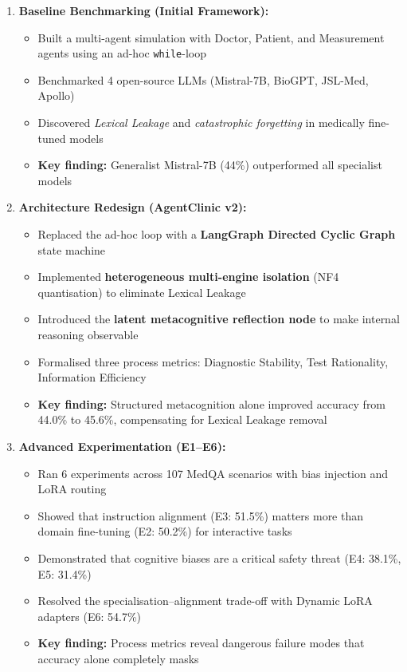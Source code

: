 \begin{enumerate}[label=\textbf{Phase \arabic*:}, leftmargin=2.5cm]
    \item \textbf{Baseline Benchmarking (Initial Framework):}
    \begin{itemize}
        \item Built a multi-agent simulation with Doctor, Patient, and Measurement agents using an ad-hoc \texttt{while}-loop
        \item Benchmarked 4 open-source LLMs (Mistral-7B, BioGPT, JSL-Med, Apollo)
        \item Discovered \textit{Lexical Leakage} and \textit{catastrophic forgetting} in medically fine-tuned models
        \item \textbf{Key finding:} Generalist Mistral-7B (44\%) outperformed all specialist models
    \end{itemize}

    \item \textbf{Architecture Redesign (AgentClinic v2):}
    \begin{itemize}
        \item Replaced the ad-hoc loop with a \textbf{LangGraph Directed Cyclic Graph} state machine
        \item Implemented \textbf{heterogeneous multi-engine isolation} (NF4 quantisation) to eliminate Lexical Leakage
        \item Introduced the \textbf{latent metacognitive reflection node} to make internal reasoning observable
        \item Formalised three process metrics: Diagnostic Stability, Test Rationality, Information Efficiency
        \item \textbf{Key finding:} Structured metacognition alone improved accuracy from 44.0\% to 45.6\%, compensating for Lexical Leakage removal
    \end{itemize}

    \item \textbf{Advanced Experimentation (E1--E6):}
    \begin{itemize}
        \item Ran 6 experiments across 107 MedQA scenarios with bias injection and LoRA routing
        \item Showed that instruction alignment (E3: 51.5\%) matters more than domain fine-tuning (E2: 50.2\%) for interactive tasks
        \item Demonstrated that cognitive biases are a critical safety threat (E4: 38.1\%, E5: 31.4\%)
        \item Resolved the specialisation--alignment trade-off with Dynamic LoRA adapters (E6: 54.7\%)
        \item \textbf{Key finding:} Process metrics reveal dangerous failure modes that accuracy alone completely masks
    \end{itemize}
\end{enumerate}

